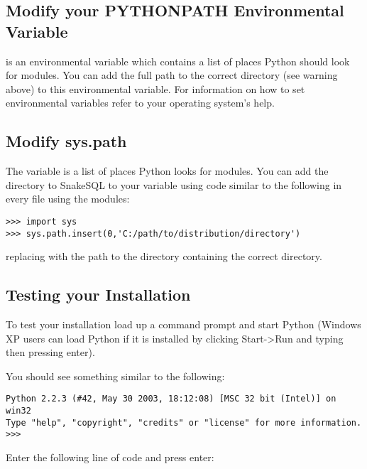 \documentclass{howto}
\begin{document}
\subsection{Modify your PYTHONPATH Environmental Variable}

 is an environmental variable which contains a list of places Python should look for modules. You can add the full path to the correct  directory (see warning above) to this environmental variable. For information on how to set environmental variables refer to your operating system's help.

\subsection{Modify sys.path}

The  variable is a list of places Python looks for modules. You can add the directory to SnakeSQL to your  variable using code similar to the following in every file using the modules:

\begin{verbatim}
>>> import sys
>>> sys.path.insert(0,'C:/path/to/distribution/directory')
\end{verbatim}
replacing  with the path to the directory containing the correct  directory.


\subsection{Testing your Installation}

To test your installation load up a command prompt and start Python (Windows XP users can load Python if it is installed by clicking Start->Run and typing  then pressing enter).

You should see something similar to the following:

\begin{verbatim}
Python 2.2.3 (#42, May 30 2003, 18:12:08) [MSC 32 bit (Intel)] on win32
Type "help", "copyright", "credits" or "license" for more information.
>>> 
\end{verbatim}

Enter the following line of code and press enter:
\end{document}
